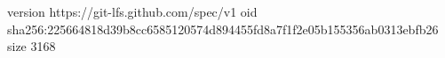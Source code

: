 version https://git-lfs.github.com/spec/v1
oid sha256:225664818d39b8cc6585120574d894455fd8a7f1f2e05b155356ab0313ebfb26
size 3168
